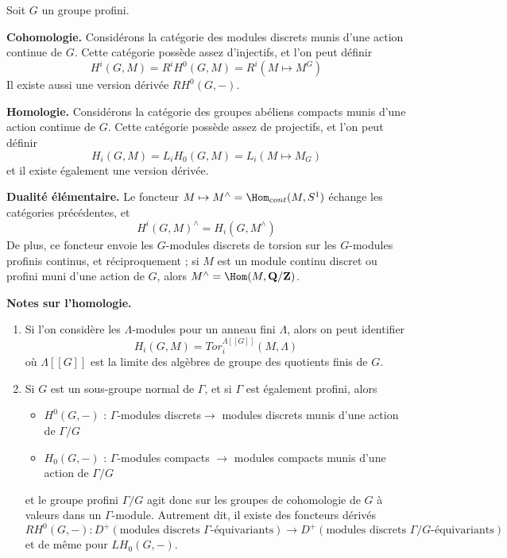 \noindent
Soit $G$ un groupe profini.

\medskip\noindent
{\bf Cohomologie.}
Considérons la catégorie des modules discrets munis d'une action continue de $G$.
Cette catégorie possède assez d'injectifs, et l'on peut définir
$$
H^i(G, M) = R^iH^0(G, M) = R^i(M\mapsto M^G)
$$
Il existe aussi une version dérivée $RH^0(G, -)$.

\medskip\noindent
{\bf Homologie.}
Considérons la catégorie des groupes abéliens compacts munis d'une action continue de $G$.
Cette catégorie possède assez de projectifs, et l'on peut définir
$$
H_i(G, M) = L_iH_0(G, M)=L_i(M\mapsto M_G)
$$
et il existe également une version dérivée.

\medskip\noindent
{\bf Dualité élémentaire.}
Le foncteur $M\mapsto M^\wedge = \Hom_{cont}(M, S^1)$
échange les catégories précédentes, et
$$
H^i(G, M)^\wedge = H_i(G, M^\wedge)
$$
De plus, ce foncteur envoie les $G$-modules discrets de torsion sur les
$G$-modules profinis continus, et réciproquement ; si $M$ est un module continu
discret ou profini muni d'une action de $G$, alors
$M^\wedge = \Hom(M, \mathbf{Q}/\mathbf{Z})$.

\medskip\noindent
{\bf Notes sur l'homologie.}
\begin{enumerate}
\item Si l'on considère les $\Lambda$-modules pour un anneau fini $\Lambda$,
alors on peut identifier
$$
H_i(G, M)=Tor_i^{\Lambda[[G]]}(M, \Lambda)
$$
où $\Lambda[[G]]$ est la limite des algèbres de groupe des quotients finis
de $G$.
\item Si $G$ est un sous-groupe normal de $\Gamma$, et si $\Gamma$ est également
profini, alors
\begin{itemize}
\item $H^0(G, -)$ : $\Gamma$-modules discrets$\to$ modules discrets
munis d'une action de $\Gamma/G$
\item $H_0(G, -)$ : $\Gamma$-modules compacts $\to$ modules compacts
munis d'une action de $\Gamma/G$
\end{itemize}
et le groupe profini $\Gamma/G$ agit donc sur les groupes de cohomologie
de $G$ à valeurs dans un $\Gamma$-module. Autrement dit, il existe des foncteurs
dérivés
$$
RH^0(G, -) :
D^{+}(\text{modules discrets }\Gamma\text{-équivariants})
\longrightarrow
D^{+}(\text{modules discrets }\Gamma/G\text{-équivariants})
$$
et de même pour $LH_0(G, -)$.
\end{enumerate}








